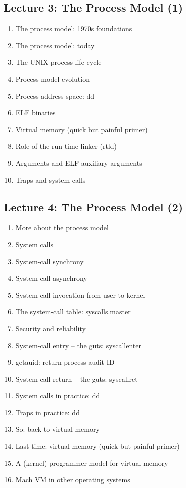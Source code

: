 \documentclass[a4paper,10pt]{article}
\begin{document}
\subsection*{Lecture 3: The Process Model (1)}

\begin{enumerate}
  \item The process model: 1970s foundations
  \item The process model: today
  \item The UNIX process life cycle
  \item Process model evolution
  \item Process address space: dd
  \item ELF binaries
  \item Virtual memory (quick but painful primer)
  \item Role of the run-time linker (rtld)
  \item Arguments and ELF auxiliary arguments
  \item Traps and system calls
\end{enumerate}

\subsection*{Lecture 4: The Process Model (2)}

\begin{enumerate}
  \item More about the process model
  \item System calls
  \item System-call synchrony
  \item System-call asynchrony
  \item System-call invocation from user to kernel
  \item The system-call table: syscalls.master
  \item Security and reliability
  \item System-call entry -- the guts: syscallenter
  \item getauid: return process audit ID
  \item System-call return -- the guts: syscallret
  \item System calls in practice: dd
  \item Traps in practice: dd
  \item So: back to virtual memory
  \item Last time: virtual memory (quick but painful primer)
  \item A (kernel) programmer model for virtual memory
  \item Mach VM in other operating systems
\end{enumerate}
\end{document}

